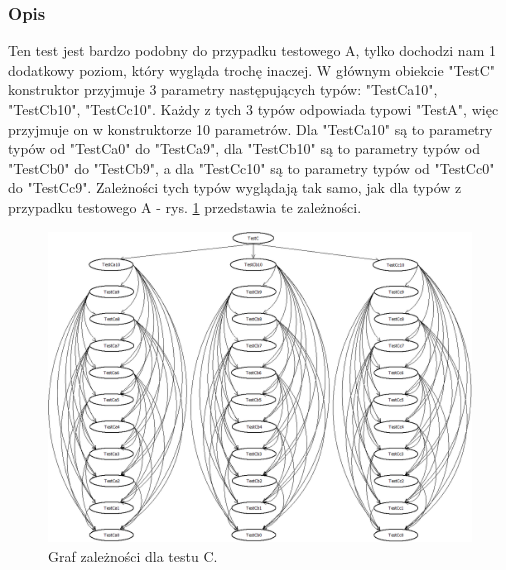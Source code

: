 \documentclass[12pt]{article}
\begin{document}
\subsubsection{Opis}
Ten test jest bardzo podobny do przypadku testowego A, tylko dochodzi nam 1 dodatkowy poziom, który wygląda trochę inaczej. W głównym obiekcie "TestC" konstruktor przyjmuje 3 parametry następujących typów: "TestCa10", "TestCb10", "TestCc10". Każdy z tych 3 typów odpowiada typowi "TestA", więc przyjmuje on w konstruktorze 10 parametrów. Dla "TestCa10" są to parametry typów od "TestCa0" do "TestCa9", dla "TestCb10" są to parametry typów od "TestCb0" do "TestCb9", a dla "TestCc10" są to parametry typów od "TestCc0" do "TestCc9". Zależności tych typów wyglądają tak samo, jak dla typów z przypadku testowego A - rys. \ref{fig:testC} przedstawia te zależności. \\

\clearpage
\begin{figure}[h]
	\begin{center}
  		\includegraphics[width=\linewidth]{TestC.png}
  		\caption{Graf zależności dla testu C.}
  		\label{fig:testC}
	\end{center}
\end{figure}
\end{document}
